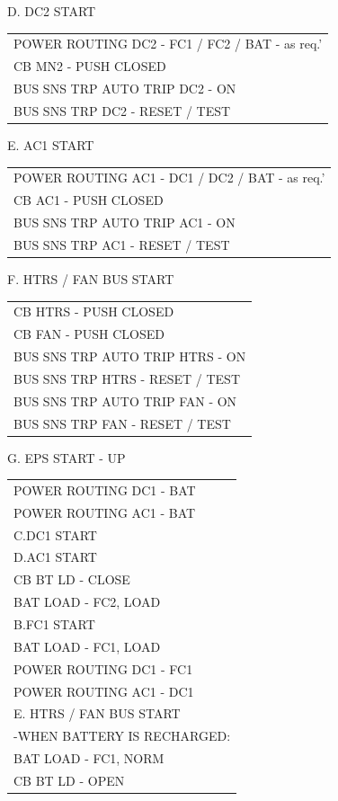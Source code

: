 \documentclass[Orbiter User Manual.tex]{subfiles}
\begin{document}
D. DC2 START
	\begin{longtable}{ p{\textwidth} }
	POWER ROUTING DC2 - FC1 / FC2 / BAT - as req.'\\
	CB MN2 - PUSH CLOSED\\
	BUS SNS TRP AUTO TRIP DC2 - ON\\
	BUS SNS TRP DC2 - RESET / TEST
	\end{longtable}

E. AC1 START
	\begin{longtable}{ p{\textwidth} }
	POWER ROUTING AC1 - DC1 / DC2 / BAT - as req.'\\
	CB AC1 - PUSH CLOSED\\
	BUS SNS TRP AUTO TRIP AC1 - ON\\
	BUS SNS TRP AC1 - RESET / TEST
	\end{longtable}

F. HTRS / FAN BUS START
	\begin{longtable}{ p{\textwidth} }
	CB HTRS - PUSH CLOSED\\
	CB FAN - PUSH CLOSED\\
	BUS SNS TRP AUTO TRIP HTRS - ON\\
	BUS SNS TRP HTRS - RESET / TEST\\
	BUS SNS TRP AUTO TRIP FAN - ON\\
	BUS SNS TRP FAN - RESET / TEST
	\end{longtable}

G. EPS START - UP
	\begin{longtable}{ p{\textwidth} }
	POWER ROUTING DC1 - BAT\\
	POWER ROUTING AC1 - BAT\\
	C.DC1 START\\
	D.AC1 START\\
	CB BT LD - CLOSE\\
	BAT LOAD - FC2, LOAD\\
	B.FC1 START\\
	BAT LOAD - FC1, LOAD\\
	POWER ROUTING DC1 - FC1\\
	POWER ROUTING AC1 - DC1\\
	E. HTRS / FAN BUS START\\
	-WHEN BATTERY IS RECHARGED:\\
	\quad BAT LOAD - FC1, NORM\\
	\quad CB BT LD - OPEN
	\end{longtable}
\end{document}
